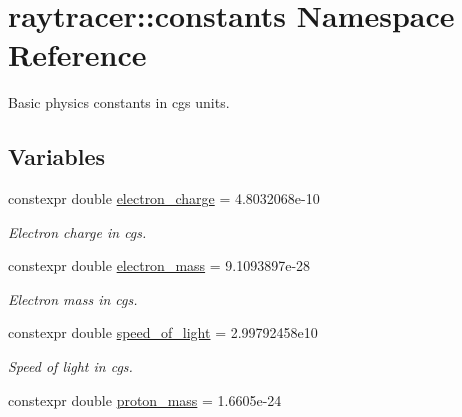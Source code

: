 \hypertarget{namespaceraytracer_1_1constants}{}\section{raytracer\+:\+:constants Namespace Reference}
\label{namespaceraytracer_1_1constants}


Basic physics constants in cgs units.  


\subsection*{Variables}
\begin{DoxyCompactItemize}
\item 
\mbox{\label{namespaceraytracer_1_1constants_a57321c1a2dc6a7a5362032408479da32}} 
constexpr double \hyperlink{namespaceraytracer_1_1constants_a57321c1a2dc6a7a5362032408479da32}{electron\+\_\+charge} = 4.\+8032068e-\/10
\begin{DoxyCompactList}\small\item\em Electron charge in cgs. \end{DoxyCompactList}\item 
\mbox{\label{namespaceraytracer_1_1constants_a8718033b4f3abf19d6eb32078ae24efa}} 
constexpr double \hyperlink{namespaceraytracer_1_1constants_a8718033b4f3abf19d6eb32078ae24efa}{electron\+\_\+mass} = 9.\+1093897e-\/28
\begin{DoxyCompactList}\small\item\em Electron mass in cgs. \end{DoxyCompactList}\item 
\mbox{\label{namespaceraytracer_1_1constants_a0325b8d091645d6938691f865bfb9a5c}} 
constexpr double \hyperlink{namespaceraytracer_1_1constants_a0325b8d091645d6938691f865bfb9a5c}{speed\+\_\+of\+\_\+light} = 2.\+99792458e10
\begin{DoxyCompactList}\small\item\em Speed of light in cgs. \end{DoxyCompactList}\item 
\mbox{\label{namespaceraytracer_1_1constants_aa74c1423a0ee9b86e821050da5a2c23d}} 
constexpr double \hyperlink{namespaceraytracer_1_1constants_aa74c1423a0ee9b86e821050da5a2c23d}{proton\+\_\+mass} = 1.\+6605e-\/24

\end{DoxyCompactItemize}
